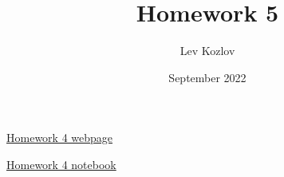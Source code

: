 \documentclass{article}
\title{Homework 5}
\author{Lev Kozlov}
\date{September 2022}
\begin{document}
\maketitle

\href{https://lvjonok.github.io/f22-theoretical-mechanics/2022/09/28/homework4.html}{Homework 4 webpage}

\href{https://github.com/lvjonok/f22-theoretical-mechanics/blob/master/homework4/main.ipynb}{Homework 4 notebook}



\newpage



\newpage


\end{document}
